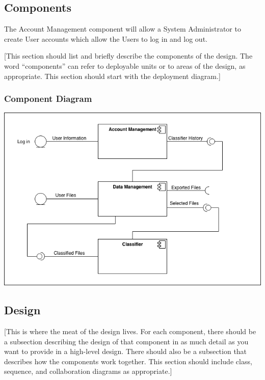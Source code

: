 \documentclass[12pt,oneside,letterpaper]{article}
\begin{document}
\subsection{Components}
The Account Management component will allow a System Administrator to create User accounts which allow the Users to log in and log out.


[This section should list and briefly describe the components of the design.  The word ``components'' can refer to deployable units or to areas of the design, as appropriate. This section should start with the deployment diagram.]

\subsubsection{Component Diagram}
\includegraphics[scale = 0.7]{Component_Diagram.png}
\begingroup
{}
\endgroup


\subsection{Design}
[This is where the meat of the design lives.  For each component, there should be a subsection describing the design of that component in as much detail as you want to provide in a high-level design.  There should also be a subsection that describes how the components work together. This section should include class, sequence, and collaboration diagrams as appropriate.]
\end{document}
